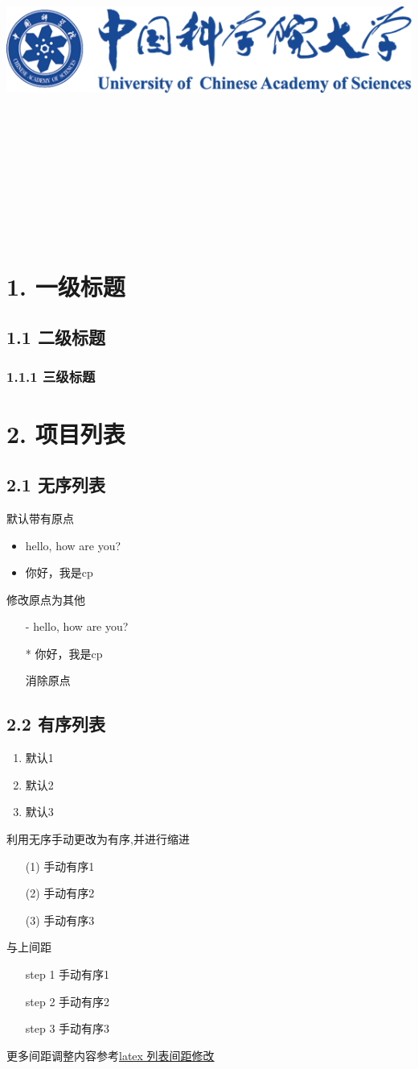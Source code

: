 \documentclass{article}
\title{
	\includegraphics[scale = 0.45]{images/title/ucas-logo.png}\\
    \vspace{1in}
    \textmd{\textbf{\hmwkClass\ \hmwkTitle}}\\
    \textmd{\textbf{\hmwkSubTitle}}\\
    \normalsize\vspace{0.1in}\small{\hmwkCompleteTime }\\
    \vspace{0.1in}\large{\textit{\hmwkClassInstructor\ }}\\
    \vspace{3in}
}
\author{\hmwkAuthorName}
\date{}
\begin{document}
\maketitle

\pagebreak

\section{1. 一级标题}
\subsection{1.1 二级标题}
\subsubsection{1.1.1 三级标题}
\section{2. 项目列表} 
\subsection{2.1 无序列表}

默认带有原点
\begin{itemize}
	\item hello, how are you?
	\item 你好，我是cp
\end{itemize} 
修改原点为其他 
\begin{itemize}
	\item[-] hello, how are you?
	\item[*] 你好，我是cp
	\item[] 消除原点
\end{itemize} 


\subsection{2.2 有序列表} 

\begin{enumerate}
	\item 默认1
	\item 默认2
	\item 默认3
\end{enumerate}

利用无序手动更改为有序,并进行缩进
\begin{itemize}[itemindent=1em]
	\item[(1)] 手动有序1
	\item[(2)] 手动有序2
	\item[(3)] 手动有序3
\end{itemize} 
与上间距
\begin{itemize}[itemindent= 15 pt]
	\item[step 1] 手动有序1
	\item[step 2] 手动有序2
	\item[step 3] 手动有序3
\end{itemize} 
更多间距调整内容参考\href{https://blog.csdn.net/robert_chen1988/article/details/83179571}{latex 列表间距修改} 
\end{document}
